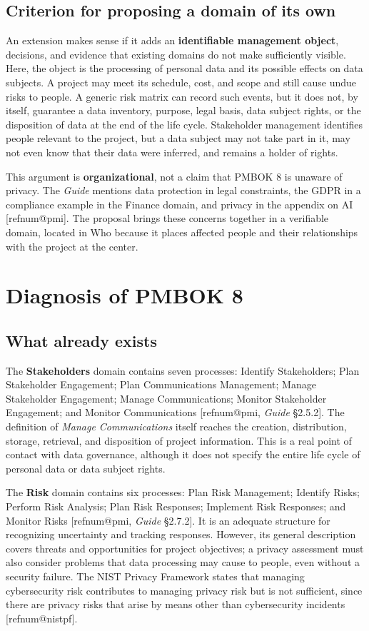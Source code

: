 \documentclass[11pt,a4paper]{article}
\makeatletter
\newcommand{\refnum}[1]{\csname refnum@#1\endcsname}
\makeatother
\begin{document}
\subsection{Criterion for proposing a domain of its own}

An extension makes sense if it adds an \textbf{identifiable management object}, decisions, and evidence that existing domains do not make sufficiently visible. Here, the object is the processing of personal data and its possible effects on data subjects. A project may meet its schedule, cost, and scope and still cause undue risks to people. A generic risk matrix can record such events, but it does not, by itself, guarantee a data inventory, purpose, legal basis, data subject rights, or the disposition of data at the end of the life cycle. Stakeholder management identifies people relevant to the project, but a data subject may not take part in it, may not even know that their data were inferred, and remains a holder of rights.

This argument is \textbf{organizational}, not a claim that PMBOK 8 is unaware of privacy. The \textit{Guide} mentions data protection in legal constraints, the GDPR in a compliance example in the Finance domain, and privacy in the appendix on AI [\refnum{pmi}]. The proposal brings these concerns together in a verifiable domain, located in Who because it places affected people and their relationships with the project at the center.

\section{Diagnosis of PMBOK 8}
\subsection{What already exists}

The \textbf{Stakeholders} domain contains seven processes: Identify Stakeholders; Plan Stakeholder Engagement; Plan Communications Management; Manage Stakeholder Engagement; Manage Communications; Monitor Stakeholder Engagement; and Monitor Communications [\refnum{pmi}, \textit{Guide} §2.5.2]. The definition of \textit{Manage Communications} itself reaches the creation, distribution, storage, retrieval, and disposition of project information. This is a real point of contact with data governance, although it does not specify the entire life cycle of personal data or data subject rights.

The \textbf{Risk} domain contains six processes: Plan Risk Management; Identify Risks; Perform Risk Analysis; Plan Risk Responses; Implement Risk Responses; and Monitor Risks [\refnum{pmi}, \textit{Guide} §2.7.2]. It is an adequate structure for recognizing uncertainty and tracking responses. However, its general description covers threats and opportunities for project objectives; a privacy assessment must also consider problems that data processing may cause to people, even without a security failure. The NIST Privacy Framework states that managing cybersecurity risk contributes to managing privacy risk but is not sufficient, since there are privacy risks that arise by means other than cybersecurity incidents [\refnum{nistpf}].
\end{document}
